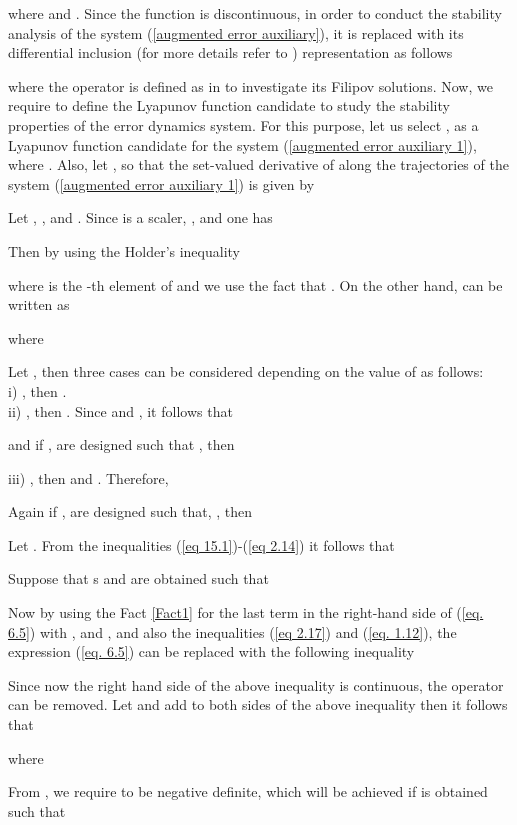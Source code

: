 \documentclass[12pt,draftcls,onecolumn]{IEEEtran}
\begin{document}
where  and . Since the  function is discontinuous, in order to conduct  the stability analysis of the system  (\ref{augmented error auxiliary}), it is replaced with its differential inclusion (for more details refer to \cite{Shevitz94,Bacciotti99}) representation as follows 

where the operator  is defined as in \cite{Shevitz94,Bacciotti99} to investigate its Filipov solutions. Now,  we require to define the Lyapunov function candidate  to study the stability properties of the error dynamics system. 
For this purpose, let us select , as a Lyapunov function candidate for the system (\ref{augmented error auxiliary 1}), where . Also, let , so that 
the set-valued derivative of  along the trajectories of the system (\ref{augmented error auxiliary 1}) is given by 
\par
Let , ,  and . Since  is a scaler, , and one has 

Then by using the Holder's inequality 

where  is the -th element of  and we use the fact that .  
On the other hand,   can be written as

where 
\par
Let , then three cases can be considered depending on the value of  as follows:\\
i) , then .\\
ii) , then . Since  and , it follows that

and if ,  are designed such that , then 

iii) , then  and . Therefore,

Again if ,  are designed such that, , then
\par
Let . From the  inequalities  (\ref{eq 15.1})-(\ref{eq 2.14})  it follows that

Suppose that s and  are obtained such that
 
Now by using the Fact \ref{Fact1} for the last term in the right-hand side of  (\ref{eq. 6.5}) with ,  and , and also the inequalities (\ref{eq 2.17}) and (\ref{eq. 1.12}), the expression (\ref{eq. 6.5}) can be replaced with the following inequality
\par
Since now the right hand side of the above inequality is continuous, the operator  can be removed. Let   and add  to both sides of the above inequality then it follows that 

where

From \cite{Shevitz94}, we require   to be negative definite, which will be achieved if  is obtained such that
\end{document}
